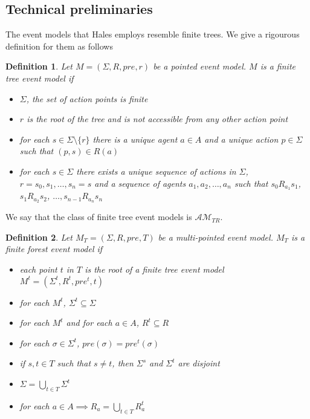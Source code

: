 \documentclass[12pt, a4paper, titlepage]{article}
\newtheorem{defn}{Definition}[subsection]
\numberwithin{equation}{section}
\newcommand{\eventClass}{\mathcal{AM}}
\newcommand{\treeClass}{\eventClass_{TR}}
\begin{document}
\subsection{Technical preliminaries}

The event models that Hales employs resemble finite trees.
We give a rigourous definition for them as follows

\begin{defn} \label{finTree}
Let $M = (\Sigma, R, pre, r)$ be a pointed event model.
$M$ is a finite tree event model if
\begin{itemize}
	\item $\Sigma$, the set of action points is finite
	\item $r$ is the root of the tree and is not accessible from any other action point
	\item for each $s \in \Sigma \setminus \{ r \}$ there is a unique agent $a \in A$ and a unique
	action $p \in \Sigma$ such that $(p,s) \in R(a)$
	\item for each $s \in \Sigma$ there exists a unique sequence of actions in $\Sigma$, $r = s_0,
	s_1, \ldots, s_n = s$ and a sequence of agents $a_1, a_2, \ldots, a_n$ such that $s_0 R_{a_1}
	s_1$, $s_1 R_{a_2} s_2$, $\ldots, s_{n-1} R_{a_n} s_n$
\end{itemize}
\end{defn}

We say that the class of finite tree event models is $\treeClass$.

\begin{defn} \label{forest}
Let $M_T = (\Sigma, R, pre, T)$ be a multi-pointed event model.
$M_T$ is a finite forest event model if
\begin{itemize}
	\item each point $t$ in $T$ is the root of a finite tree event model $M^t = (\Sigma^t, R^t,
	pre^t, t)$
	\item for each $M^t$, $\Sigma^t \subseteq \Sigma$
	\item for each $M^t$ and for each $a \in A$, $R^t \subseteq R$
	\item for each $\sigma \in \Sigma^t$, $pre(\sigma) = pre^t(\sigma)$
	\item if $s, t \in T$ such that $s \neq t$, then $\Sigma^s$ and $\Sigma^t$ are disjoint
  \item $\Sigma = \bigcup_{t \in T} \Sigma^t$
  \item for each $a \in A \implies R_a = \bigcup_{t \in T} R_a^t$
\end{itemize}
\end{defn}
\end{document}
